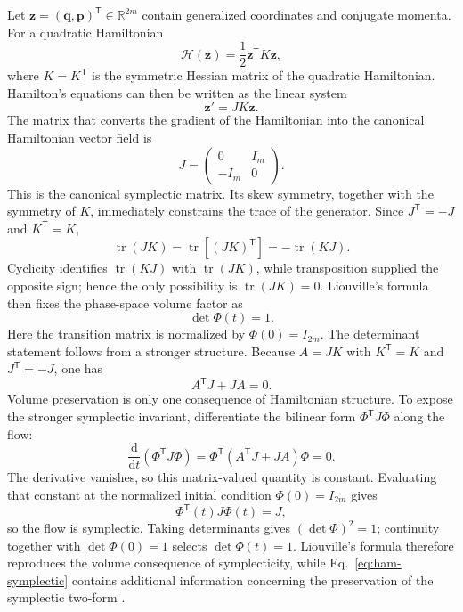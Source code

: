 \documentclass[11pt,a4paper]{article}
\newcommand{\be}{\begin{equation}}
\newcommand{\ee}{\end{equation}}
\newcommand{\lb}[1]{\label{#1}}
\newcommand{\dd}{\mathrm{d}}
\newcommand{\R}{\mathbb{R}}
\DeclareMathOperator{\tr}{tr}
\theoremstyle{definition}
\numberwithin{equation}{section}
\begin{document}
Let $\mathbf{z}=(\mathbf{q},\mathbf{p})^{\mathsf T}\in\R^{2m}$ contain generalized coordinates and conjugate momenta. For a quadratic Hamiltonian
\be
\mathcal{H}(\mathbf{z})
=
\frac{1}{2}\mathbf{z}^{\mathsf T}K\mathbf{z},
\lb{eq:quadratic-hamiltonian}
\ee
where $K=K^{\mathsf T}$ is the symmetric Hessian matrix of the quadratic Hamiltonian. Hamilton's equations can then be written as the linear system
\be
\mathbf{z}'=JK\mathbf{z}.
\lb{eq:linear-hamiltonian}
\ee
The matrix that converts the gradient of the Hamiltonian into the canonical Hamiltonian vector field is
\be
J=
\begin{pmatrix}
0 & I_m\\
-I_m & 0
\end{pmatrix}.
\lb{eq:symplectic-J}
\ee
This is the canonical symplectic matrix. Its skew symmetry, together with the symmetry of $K$, immediately constrains the trace of the generator. Since $J^{\mathsf T}=-J$ and $K^{\mathsf T}=K$,
\be
\tr(JK)
=
\tr[(JK)^{\mathsf T}]
=
-\tr(KJ).
\lb{eq:ham-trace1}
\ee
Cyclicity identifies $\tr(KJ)$ with $\tr(JK)$, while transposition supplied the opposite sign; hence the only possibility is $\tr(JK)=0$. Liouville's formula then fixes the phase-space volume factor as
\be
\det\Phi(t)=1.
\lb{eq:ham-det}
\ee
Here the transition matrix is normalized by $\Phi(0)=I_{2m}$. The determinant statement follows from a stronger structure. Because $A=JK$ with $K^{\mathsf T}=K$ and $J^{\mathsf T}=-J$, one has
\be
A^{\mathsf T}J+JA=0.
\lb{eq:ham-generator-symplectic}
\ee
Volume preservation is only one consequence of Hamiltonian structure. To expose the stronger symplectic invariant, differentiate the bilinear form $\Phi^{\mathsf T}J\Phi$ along the flow:
\be
\frac{\dd}{\dd t}(\Phi^{\mathsf T}J\Phi)
=
\Phi^{\mathsf T}(A^{\mathsf T}J+JA)\Phi
=0.
\lb{eq:ham-symplectic-derivative}
\ee
The derivative vanishes, so this matrix-valued quantity is constant. Evaluating that constant at the normalized initial condition $\Phi(0)=I_{2m}$ gives
\be
\Phi^{\mathsf T}(t)J\Phi(t)=J,
\lb{eq:ham-symplectic}
\ee
so the flow is symplectic. Taking determinants gives $(\det\Phi)^2=1$; continuity together with $\det\Phi(0)=1$ selects $\det\Phi(t)=1$. Liouville's formula therefore reproduces the volume consequence of symplecticity, while Eq.~\eqref{eq:ham-symplectic} contains additional information concerning the preservation of the symplectic two-form \cite{goldstein2002,arnold_mechanics1989}.
\end{document}
